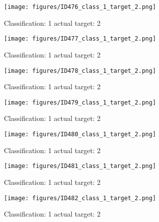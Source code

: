 \begin{figure}[h!]
\begin{center}
\texttt{[image: figures/ID476\_class\_1\_target\_2.png]}
\end{center}
\caption{ Classification: 1 actual target: 2}
\label{fig:ID476_class_1_target_2}
\end{figure}
\begin{figure}[h!]
\begin{center}
\texttt{[image: figures/ID477\_class\_1\_target\_2.png]}
\end{center}
\caption{ Classification: 1 actual target: 2}
\label{fig:ID477_class_1_target_2}
\end{figure}
\begin{figure}[h!]
\begin{center}
\texttt{[image: figures/ID478\_class\_1\_target\_2.png]}
\end{center}
\caption{ Classification: 1 actual target: 2}
\label{fig:ID478_class_1_target_2}
\end{figure}
\begin{figure}[h!]
\begin{center}
\texttt{[image: figures/ID479\_class\_1\_target\_2.png]}
\end{center}
\caption{ Classification: 1 actual target: 2}
\label{fig:ID479_class_1_target_2}
\end{figure}
\begin{figure}[h!]
\begin{center}
\texttt{[image: figures/ID480\_class\_1\_target\_2.png]}
\end{center}
\caption{ Classification: 1 actual target: 2}
\label{fig:ID480_class_1_target_2}
\end{figure}
\begin{figure}[h!]
\begin{center}
\texttt{[image: figures/ID481\_class\_1\_target\_2.png]}
\end{center}
\caption{ Classification: 1 actual target: 2}
\label{fig:ID481_class_1_target_2}
\end{figure}
\begin{figure}[h!]
\begin{center}
\texttt{[image: figures/ID482\_class\_1\_target\_2.png]}
\end{center}
\caption{ Classification: 1 actual target: 2}
\label{fig:ID482_class_1_target_2}
\end{figure}
